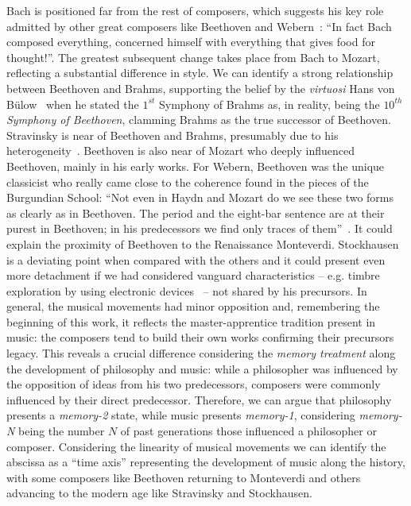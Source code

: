 \documentclass[
 aip,
 jmp,
 amsmath,amssymb,
 reprint,
]{revtex4-1}
\begin{document}
Bach is positioned far from the rest of
composers, which suggests his key role
admitted by other great composers like Beethoven and
Webern~\cite{Webern}: ``In fact Bach composed everything, concerned
himself with everything that gives food for thought!''. 
The greatest subsequent change takes place from Bach to Mozart,
reflecting a substantial difference in style.
We can identify a strong relationship between
Beethoven and Brahms, supporting the belief by the \textit{virtuosi} Hans von B\"{u}low~\cite{Bulow} when he
stated the $1^{st}$ Symphony of Brahms as, in reality, being the \textit{$10^{th}$ Symphony of
Beethoven}, clamming Brahms as the true successor of
Beethoven. Stravinsky is near of Beethoven and Brahms,
presumably due to his heterogeneity~\cite{BennettHistory,
  Lovelock}. Beethoven is also near of Mozart who deeply influenced
Beethoven, mainly in his early works.
For Webern, Beethoven was the unique classicist who really came close
to the coherence found in the pieces of the Burgundian School: ``Not even
in Haydn and Mozart do we see these two forms as clearly as in
Beethoven. The period and the eight-bar sentence are at their purest
in Beethoven; in his predecessors we find only traces of them''~\cite{Webern}. It
could explain the proximity of Beethoven to the Renaissance  Monteverdi.
Stockhausen is a deviating point when compared with the others and it
could present even more detachment if we had considered
vanguard characteristics -- e.g. timbre exploration by using
electronic devices~\cite{Lovelock} -- not
shared by his precursors.
In general, the musical movements had minor opposition and,
remembering the beginning of this work, it reflects the
master-apprentice
tradition present in music: the composers tend to build their own
works confirming their precursors legacy. This reveals a crucial difference
considering the \textit{memory treatment} along the development of
philosophy and music: while a philosopher was influenced by the
opposition of ideas from his two predecessors, composers were commonly
influenced by their direct predecessor. Therefore, we can argue that philosophy
presents a \textit{memory-2} state, while music presents
\textit{memory-1}, considering \textit{memory-N} being the number $N$
of past generations those influenced a philosopher or
composer. Considering the linearity of musical movements we can
identify the abscissa as a ``time axis'' representing the development
of music along the history, with some composers
like Beethoven returning to Monteverdi and others advancing to the
modern age like Stravinsky and Stockhausen.
\end{document}

